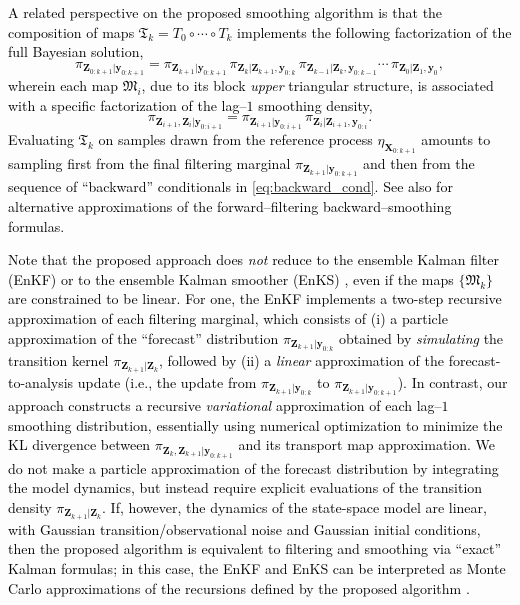 \documentclass[twoside,11pt]{article}
\newcommand{\Xb}{\boldsymbol{X}}
\newcommand{\yb}{\boldsymbol{y}}
\newcommand{\Zb}{\boldsymbol{Z}}
\newcommand{\submap}{\mathfrak{M}}
\newcommand{\hrevone}{\textcolor{black} }
\begin{document}
%
%
%
%
%
%
%
%
%
%
%
%
%
%
%
%
%
%
%
%
%
%
%
%
%
%
%
%
%

\hrevone{A related perspective on the 
%
%
proposed smoothing algorithm is that
the composition of maps $\mathfrak{T}_k = T_0 \circ \cdots \circ T_k$ 
%
implements 
%
%
the following factorization of the full Bayesian solution,
\begin{equation}
\label{eq:backward_cond}
\pi_{\Zb_{0:k+1} \vert \yb_{0:k+1} }  =  \pi_{\Zb_{k+1} \vert \yb_{0:k+1}} \,
\pi_{\Zb_{k} \vert \Zb_{k+1}, \yb_{0:k}} \,  \pi_{\Zb_{k-1} \vert \Zb_{k}, \yb_{0:k-1}}  \cdots \, \pi_{\Zb_0 \vert \Zb_1, \yb_{0}}, 
\end{equation} 
wherein each map 
$\submap_i$, due to its block {\it upper} triangular structure, 
is associated with a specific
factorization of the 
lag--$1$ smoothing density,
\begin{equation}
\pi_{\Zb_{i+1}, \Zb_{i} \vert \yb_{0:i+1} } = \pi_{\Zb_{i+1} \vert \yb_{0:i+1}} \, \pi_{\Zb_{i} \vert \Zb_{i+1}, \yb_{0:i}}. 
\end{equation}
%
%
%
%
%
%
%
%
%
%
%
%
%
%
%
%
%
%
%
%
%
%
%
%
%
Evaluating $\mathfrak{T}_k$ on samples drawn from the reference process $\eta_{\Xb_{0:k+1}}$ amounts to sampling first from the final filtering marginal $\pi_{\Zb_{k+1} \vert \yb_{0:k+1}}$ and then from the sequence of ``backward'' conditionals
in \eqref{eq:backward_cond}.
%
%
See also \citep{kitagawa1987non,doucet2009tutorial,godsill2012monte} for alternative %
approximations of the forward--filtering backward--smoothing formulas.%
%
}


\hrevone{%
%
Note that the proposed approach does \emph{not} 
reduce to the ensemble Kalman filter (EnKF) or to the ensemble Kalman smoother
(EnKS) \citep{evensen2003ensemble,evensen2000ensemble}, even if the maps $\{\submap_k\}$ are constrained to be linear.
%
%
%
For one, the EnKF implements a two-step recursive approximation of each filtering marginal, which consists of  
(i) %
a particle approximation of the
``forecast'' distribution $\pi_{\Zb_{k+1} \vert \yb_{0:k}}$ obtained by {\it simulating} the transition kernel $\pi_{\Zb_{k+1}\vert\Zb_k}$, 
%
followed by 
(ii) a 
{\it linear} approximation of the forecast-to-analysis update (i.e., the update from $\pi_{\Zb_{k+1} \vert \yb_{0:k}}$ to $\pi_{\Zb_{k+1} \vert \yb_{0:k+1}}$).
%
%
%
%
%
%
%
In contrast, our approach constructs a recursive {\it variational} approximation of each lag--$1$ smoothing distribution,
essentially using
numerical optimization to minimize the KL divergence between
$\pi_{\Zb_{k}, \Zb_{k+1} \vert \yb_{0:k+1}}$ and its transport map approximation. 
%
%
%
%
%
We do not %
make a particle approximation of 
the forecast distribution 
%
by integrating the model dynamics, but instead require %
explicit evaluations of the transition density $\pi_{\Zb_{k+1}\vert\Zb_k}$.
%
%
 If, however, the dynamics of the state-space model are linear, with Gaussian transition/observational noise and Gaussian initial conditions, then the proposed algorithm is equivalent to
 filtering and 
 smoothing via
 ``exact'' Kalman formulas;
 in this case, the EnKF and EnKS can be interpreted as Monte Carlo approximations of the recursions defined by the proposed algorithm 
 \citep{raanes2016ensemble}. 
%
}
%
%
%
%
\end{document}
